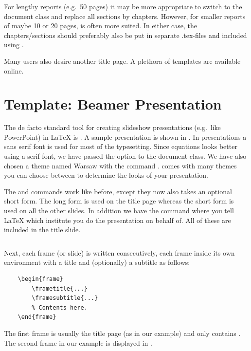 {For lengthy reports (e.g.\ 50 pages) it may be more appropriate to switch to the  document class and replace all sections by chapters. However, for smaller reports of maybe 10 or 20 pages,  is often more suited. In either case, the chapters/sections should preferably also be put in separate .tex-files and included using \latexin{}.

Many users also desire another title page. A plethora of templates are available online.

\section{Template: Beamer Presentation}
The de facto standard tool for creating slideshow presentations (e.g.\ like PowerPoint) in \LaTeX{} is \beamer{}. A sample presentation is shown in . In \beamer{} presentations a sans serif font is used for most of the typesetting. Since equations looks better using a serif font, we have passed the option  to the document class. We have also chosen a theme named Warsaw with the command \latexin{\usetheme}. \beamer{} comes with many themes you can choose between to determine the looks of your presentation.

The \latexin{\author} and \latexin{\title} commands work like before, except they now also takes an optional short form. The long form is used on the title page whereas the short form is used on all the other slides. In addition we have the \latexin{\institute} command where you tell \LaTeX{} which institute you do the presentation on behalf of. All of these are included in the title slide.

\begin{longlisting}
	\inputminted[frame=lines,linenos]{latex}{latex/beamer.tex}
	\caption{A \LaTeX{} \beamer{} example}
	\label{lst:latex:beamer}
\end{longlisting}

Next, each frame (or slide) is written consecutively, each frame inside its own  environment with a title and (optionally) a subtitle as follows:

\begin{verbatim}
	\begin{frame}
		\frametitle{...}
		\framesubtitle{...}
		% Contents here.
	\end{frame}
\end{verbatim}
The first frame is usually the title page (as in our example) and only contains \latexin{\titlepage}. The second frame in our example is displayed in .

}
